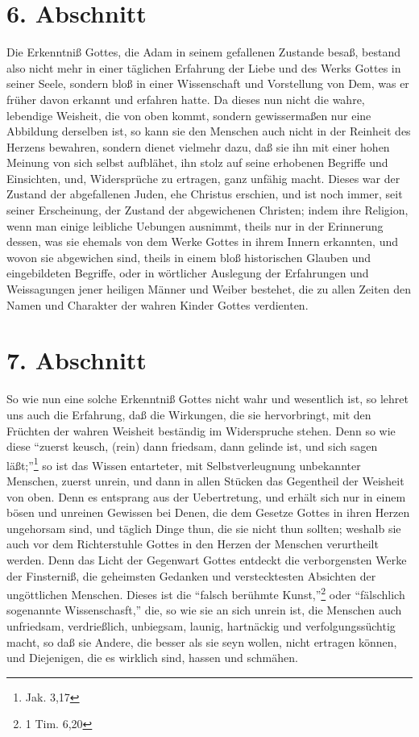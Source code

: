 \section{6. Abschnitt}

Die Erkenntniß Gottes, die Adam in seinem gefallenen Zustande besaß, bestand
also nicht mehr in einer täglichen Erfahrung der Liebe und des Werks Gottes in
seiner Seele, sondern bloß in einer Wissenschaft und Vorstellung von Dem, was er
früher davon erkannt und erfahren hatte. Da dieses nun nicht die wahre,
lebendige Weisheit, die von oben kommt, sondern gewissermaßen nur eine Abbildung
derselben ist, so kann sie den Menschen auch nicht in der Reinheit des Herzens
bewahren, sondern dienet vielmehr dazu, daß sie ihn mit einer hohen Meinung von
sich selbst aufblähet, ihn stolz auf seine erhobenen Begriffe und Einsichten,
und, Widersprüche zu ertragen, ganz unfähig macht. Dieses war der Zustand der
abgefallenen Juden, ehe Christus erschien, und ist noch immer, seit seiner
Erscheinung, der Zustand der abgewichenen Christen; indem ihre Religion, wenn
man einige leibliche Uebungen ausnimmt, theils nur in der Erinnerung dessen, was
sie ehemals von dem Werke Gottes in ihrem Innern erkannten, und wovon sie
abgewichen sind, theils in einem bloß historischen Glauben und eingebildeten
Begriffe, oder in wörtlicher Auslegung der Erfahrungen und Weissagungen jener
heiligen Männer und Weiber bestehet, die zu allen Zeiten den Namen und Charakter
der wahren Kinder Gottes verdienten.

\section{7. Abschnitt}

So wie nun eine solche Erkenntniß Gottes nicht wahr und wesentlich ist, so
lehret uns auch die Erfahrung, daß die Wirkungen, die sie hervorbringt, mit den
Früchten der wahren Weisheit beständig im Widerspruche stehen. Denn so wie diese
"`zuerst keusch, (rein) dann friedsam, dann gelinde ist, und sich sagen
läßt;"'\footnote{Jak. 3,17} so ist das Wissen entarteter, mit Selbstverleugnung
unbekannter Menschen, zuerst unrein, und dann in allen Stücken das Gegentheil
der Weisheit von oben. Denn es entsprang aus der Uebertretung, und erhält sich
nur in einem bösen und unreinen Gewissen bei Denen, die dem Gesetze Gottes in
ihren Herzen ungehorsam sind, und täglich Dinge thun, die sie nicht thun
sollten; weshalb sie auch vor dem Richterstuhle Gottes in den Herzen der
Menschen verurtheilt werden. Denn das Licht der Gegenwart Gottes entdeckt die
verborgensten Werke der Finsterniß, die geheimsten Gedanken und verstecktesten
Absichten der ungöttlichen Menschen. Dieses ist die "`falsch berühmte
Kunst,"'\footnote{1 Tim. 6,20} oder  "`fälschlich sogenannte Wissenschasft,"'
die, so wie sie an sich unrein ist, die Menschen auch unfriedsam, verdrießlich,
unbiegsam, launig, hartnäckig und verfolgungssüchtig macht, so daß sie Andere,
die besser als sie seyn wollen, nicht ertragen können, und Diejenigen, die es
wirklich sind, hassen und schmähen.


